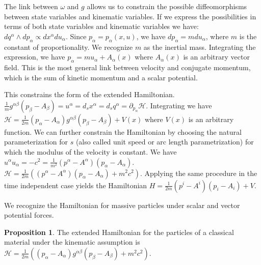 \documentclass[smallextended]{svjour3}
\numberwithin{equation}{section}
\theoremstyle{definition}
\newtheorem{prop}[equation]{Proposition}
\begin{document}
The link between $\omega$ and $g$ allows us to constrain the possible diffeomorphisms between state variables and kinematic variables. If we express the possibilities in terms of both state variables and kinematic variables we have: $dq^\alpha \wedge dp_\alpha \propto dx^\alpha du_\alpha$. Since  $p_\alpha=p_\alpha(x, u)$, we have $dp_\alpha = m du_\alpha$, where $m$ is the constant of proportionality. We recognize $m$ as the inertial mass. Integrating the expression, we have $p_\alpha = m u_\alpha + A_\alpha(x)$ where $A_\alpha(x)$ is an arbitrary vector field. This is the most general link between velocity and conjugate momentum, which is the sum of kinetic momentum and a scalar potential.

This constrains the form of the extended Hamiltonian. $\frac{1}{m}g^{\alpha\beta}(p_\beta-A_\beta) = u^\alpha = d_s x^\alpha = d_s q^\alpha = \partial_{p_\alpha} \mathcal{H}$. Integrating we have $\mathcal{H}=\frac{1}{2m}(p_\alpha-A_\alpha)g^{\alpha\beta}(p_\beta-A_\beta)+V(x)$ where $V(x)$ is an arbitrary function. We can further constrain the Hamiltonian by choosing the natural parameterization for $s$ (also called unit speed or arc length parametrization) for which the modulus of the velocity is constant. We have $u^\alpha u_\alpha = - c^2 = \frac{1}{m^2}(p^\alpha-A^\alpha)(p_\alpha-A_\alpha)$. $\mathcal{H}=\frac{1}{2m}((p^\alpha-A^\alpha)(p_\alpha-A_\alpha) + m^2 c^2)$. Applying the same procedure in the time independent case yields the Hamiltonian $H=\frac{1}{2m}(p^i-A^i)(p_i-A_i)+V$.

We recognize the Hamiltonian for massive particles under scalar and vector potential forces.

\begin{prop}\label{prop:kinetic_hamiltonian}
The extended Hamiltonian for the particles of a classical material under the kinematic assumption is $\mathcal{H}=\frac{1}{2m}((p_\alpha-A_\alpha)g^{\alpha\beta}(p_\beta-A_\beta) + m^2 c^2)$.
\end{prop}
\end{document}
